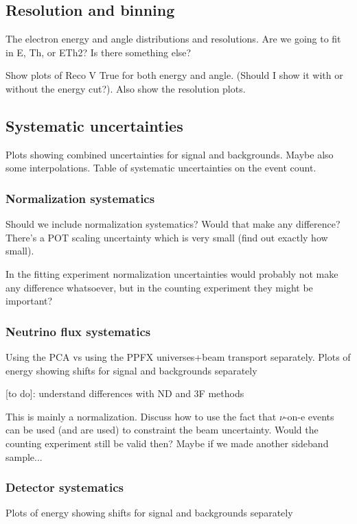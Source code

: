 \subsection{Resolution and binning}
The electron energy and angle distributions and resolutions. Are we going to fit in E, Th, or ETh2? Is there something else?

Show plots of Reco V True for both energy and angle. (Should I show it with or without the energy cut?). Also show the resolution plots.

\subsection{Systematic uncertainties}
Plots showing combined uncertainties for signal and backgrounds. Maybe also some interpolations. Table of systematic uncertainties on the event count.

\subsubsection*{Normalization systematics}
Should we include normalization systematics? Would that make any difference? There's a POT scaling uncertainty which is very small (find out exactly how small).

In the fitting experiment normalization uncertainties would probably not make any difference whatsoever, but in the counting experiment they might be important?

\subsubsection*{Neutrino flux systematics}
Using the PCA vs using the PPFX universes+beam transport separately. Plots of energy showing shifts for signal and backgrounds separately

[to do]: understand differences with ND and 3F methods

This is mainly a normalization. Discuss how to use the fact that $\nu$-on-e events can be used (and are used) to constraint the beam uncertainty. Would the counting experiment still be valid then? Maybe if we made another sideband sample...

\subsubsection*{Detector systematics}
Plots of energy showing shifts for signal and backgrounds separately

